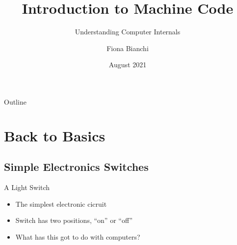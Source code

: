 \documentclass{beamer}
\title{Introduction to Machine Code}
\subtitle{Understanding Computer Internals}
\author{Fiona Bianchi}
\institute{HiKlas Ltd}
\date{August 2021}
\begin{document}
\begin{frame}
  \titlepage
\end{frame}

\begin{frame}{Outline}
  \tableofcontents
\end{frame}


\section{Back to Basics}

\subsection[Switches]{Simple Electronics Switches}

\begin{frame}{A Light Switch}

  \begin{itemize}
  \item
    The simplest electronic cicruit
  \item
    Switch has two positions, ``on'' or ``off''
  \item
    What has this got to do with computers?
  \end{itemize}
  
  
\end{frame}
\end{document}
